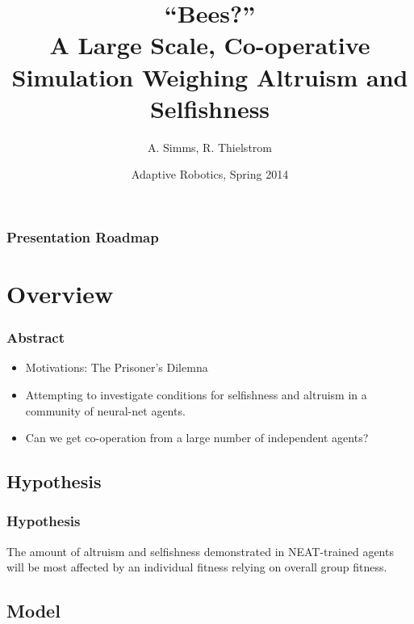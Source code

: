 \documentclass{beamer}
\title[Bees?]{``Bees?''\\ A Large Scale, Co-operative Simulation Weighing 
              Altruism and Selfishness}
\author{A. Simms, R. Thielstrom}
\institute{Swarthmore College}
\date{Adaptive Robotics, Spring 2014}
\begin{document}
  
  \begin{frame}[t]
    \titlepage
  \end{frame}


  \begin{frame}[t]\frametitle{Presentation Roadmap}
    \setcounter{tocdepth}{2}
    \tableofcontents
    \setcounter{tocdepth}{3}
  \end{frame}

  \section{Overview} %
  \label{sec:overview}

    \begin{frame}[c]\frametitle{Abstract}
      \begin{itemize}
        \item Motivations: The Prisoner's Dilemna
        \item Attempting to investigate conditions for selfishness and altruism
              in a community of neural-net agents.
        \item Can we get co-operation from a large number of independent 
              agents?
      \end{itemize}
    \end{frame}

    \subsection{Hypothesis} %
    \label{sub:hypothesis}

      \begin{frame}[c]\frametitle{Hypothesis}
          
          The amount of altruism and selfishness demonstrated in NEAT-trained
          agents will be most affected by an individual fitness relying
          on overall group fitness.
      
      \end{frame}
    
    
    \subsection{Model} %
    \label{sub:model}
      
\end{document}

